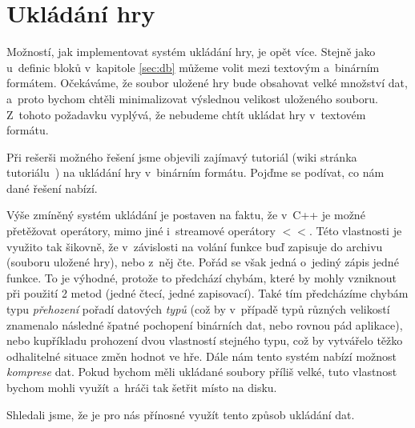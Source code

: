 
\section{Ukládání hry}

Možností, jak implementovat systém ukládání hry, je opět více. Stejně jako u~definic bloků v~kapitole \ref{sec:db} můžeme volit mezi textovým a~binárním formátem. Očekáváme, že soubor uložené hry bude obsahovat velké množství dat, a~proto bychom chtěli minimalizovat výslednou velikost uloženého souboru. Z~tohoto požadavku vyplývá, že nebudeme chtít ukládat hry v~textovém formátu.

Při rešerši možného řešení jsme objevili zajímavý tutoriál (wiki stránka tutoriálu~\citep{ue_save_system}) na ukládání hry v~binárním formátu. Pojďme se podívat, co nám dané řešení nabízí.

Výše zmíněný systém ukládání je postaven na faktu, že v~C++ je možné přetěžovat operátory, mimo jiné i~streamové operátory $<<$. Této vlastnosti je využito tak šikovně, že v~závislosti na volání funkce buď zapisuje do archivu (souboru uložené hry), nebo z~něj čte. Pořád se však jedná o~jediný zápis jedné funkce. To je výhodné, protože to předchází chybám, které by mohly vzniknout při použití 2 metod (jedné čtecí, jedné zapisovací). Také tím předcházíme chybám typu \textit{přehození} pořadí datových \textit{typů} (což by v~případě typů různých velikostí znamenalo následné špatné pochopení binárních dat, nebo rovnou pád aplikace), nebo kupříkladu prohození dvou vlastností stejného typu, což by vytvářelo těžko odhalitelné situace změn hodnot ve hře. Dále nám tento systém nabízí možnost \textit{komprese} dat. Pokud bychom měli ukládané soubory příliš velké, tuto vlastnost bychom mohli využít a~hráči tak šetřit místo na disku.

Shledali jsme, že je pro nás přínosné využít tento způsob ukládání dat.
